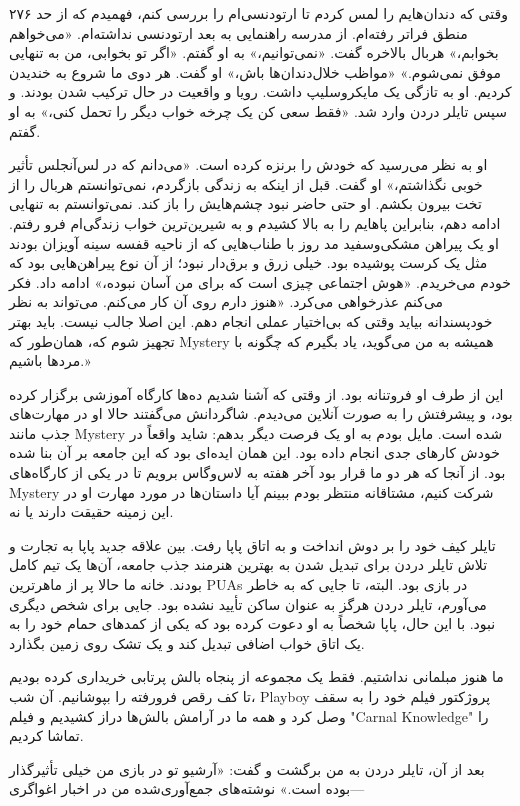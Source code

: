 ۲۷۶ وقتی که دندان‌هایم را لمس کردم تا ارتودنسی‌ام را بررسی کنم، فهمیدم که از حد منطق فراتر رفته‌ام. از مدرسه راهنمایی به بعد ارتودنسی نداشته‌ام. «می‌خواهم بخوابم،» هربال بالاخره گفت. «نمی‌توانیم،» به او گفتم. «اگر تو بخوابی، من به تنهایی موفق نمی‌شوم.» «مواظب خلال‌دندان‌ها باش،» او گفت. هر دوی ما شروع به خندیدن کردیم. او به تازگی یک مایکروسلیپ داشت. رویا و واقعیت در حال ترکیب شدن بودند. و سپس تایلر دردن وارد شد. «فقط سعی کن یک چرخه خواب دیگر را تحمل کنی،» به او گفتم.

او به نظر می‌رسید که خودش را برنزه کرده است. «می‌دانم که در لس‌آنجلس تأثیر خوبی نگذاشتم،» او گفت. قبل از اینکه به زندگی بازگردم، نمی‌توانستم هربال را از تخت بیرون بکشم. او حتی حاضر نبود چشم‌هایش را باز کند. نمی‌توانستم به تنهایی ادامه دهم، بنابراین پاهایم را به بالا کشیدم و به شیرین‌ترین خواب زندگی‌ام فرو رفتم. او یک پیراهن مشکی‌وسفید مد روز با طناب‌هایی که از ناحیه قفسه سینه آویزان بودند مثل یک کرست پوشیده بود. خیلی زرق و برق‌دار نبود؛ از آن نوع پیراهن‌هایی بود که خودم می‌خریدم. «هوش اجتماعی چیزی است که برای من آسان نبوده،» ادامه داد. فکر می‌کنم عذرخواهی می‌کرد. «هنوز دارم روی آن کار می‌کنم. می‌تواند به نظر خود‌پسندانه بیاید وقتی که بی‌اختیار عملی انجام دهم. این اصلا جالب نیست. باید بهتر تجهیز شوم که، همان‌طور که Mystery همیشه به من می‌گوید، یاد بگیرم که چگونه با مردها باشیم.»

این از طرف او فروتنانه بود. از وقتی که آشنا شدیم ده‌ها کارگاه آموزشی برگزار کرده بود، و پیشرفتش را به صورت آنلاین می‌دیدم. شاگردانش می‌گفتند حالا او در مهارت‌های جذب مانند Mystery شده است. مایل بودم به او یک فرصت دیگر بدهم: شاید واقعاً در خودش کارهای جدی انجام داده بود. این همان ایده‌ای بود که این جامعه بر آن بنا شده بود. از آنجا که هر دو ما قرار بود آخر هفته به لاس‌وگاس برویم تا در یکی از کارگاه‌های Mystery شرکت کنیم، مشتاقانه منتظر بودم ببینم آیا داستان‌ها در مورد مهارت او در این زمینه حقیقت دارند یا نه.

تایلر کیف خود را بر دوش انداخت و به اتاق پاپا رفت. بین علاقه‌ جدید پاپا به تجارت و تلاش تایلر دردن برای تبدیل شدن به بهترین هنرمند جذب جامعه، آن‌ها یک تیم کامل بودند. خانه‌ ما حالا پر از ماهرترین PUAs در بازی بود. البته، تا جایی که به خاطر می‌آورم، تایلر دردن هرگز به عنوان ساکن تأیید نشده بود. جایی برای شخص دیگری نبود. با این حال، پاپا شخصاً به او دعوت کرده بود که یکی از کمدهای حمام خود را به یک اتاق خواب اضافی تبدیل کند و یک تشک روی زمین بگذارد.

ما هنوز مبلمانی نداشتیم. فقط یک مجموعه از پنجاه بالش پرتابی خریداری کرده بودیم تا کف رقص فرورفته را بپوشانیم. آن شب، Playboy پروژکتور فیلم خود را به سقف وصل کرد و همه ما در آرامش بالش‌ها دراز کشیدیم و فیلم "Carnal Knowledge" را تماشا کردیم.

بعد از آن، تایلر دردن به من برگشت و گفت: «آرشیو تو در بازی من خیلی تأثیرگذار بوده است.» نوشته‌های جمع‌آوری‌شده من در اخبار اغواگری—